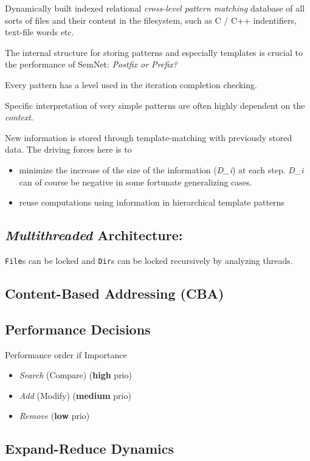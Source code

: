 \documentclass[a4paper,10pt,twocolumn]{article}
\newcommand{\codeCxxClass}[1]{\lstset{language=C++}\lstinline!#1!}
\newcommand{\sn}[0]{SemNet}
\begin{document}
Dynamically built indexed relational \emph{cross-level pattern matching}
database of all sorts of files and their content in the filesystem, such as C /
C++ indentifiers, text-file words etc.

The internal structure for storing patterns and especially templates is crucial
to the performance of \sn{}: {\centering \emph{Postfix or Prefix?}}

Every pattern has a level used in the iteration completion checking.

Specific interpretation of very simple patterns are often highly dependent on
the \emph{context}.

New information is stored through template-matching with previously stored
data. The driving forces here is to
\begin{itemize}
\item minimize the increase of the size of the information (\textit{D_i}) at
  each step. \textit{D_i} can of course be negative in some fortunate
  generalizing cases.
\item reuse computations using information in hierarchical template patterns
\end{itemize}

\subsection{ \emph{Multithreaded} Architecture:}

\codeCxxClass{File}s can be locked and \codeCxxClass{Dir}s can be locked recursively by
analyzing threads.

\subsection{ Content-Based Addressing (CBA) }

\subsection{ Performance Decisions}

Performance order if Importance
\begin{itemize}
\item \textit{Search} (Compare) (\textbf{high} prio)
\item \textit{Add} (Modify) (\textbf{medium} prio)
\item \textit{Remove} (\textbf{low} prio)
\end{itemize}

\subsection{Expand-Reduce Dynamics}
\end{document}
